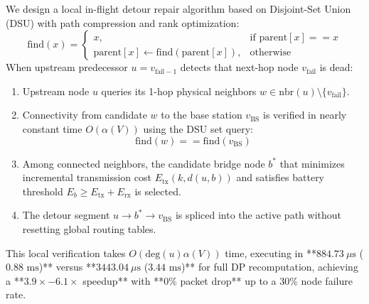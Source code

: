 \documentclass[journal]{IEEEtran}
\begin{document}
We design a local in-flight detour repair algorithm based on Disjoint-Set Union (DSU) with path compression and rank optimization:
\begin{equation}
\text{find}(x) = \begin{cases} x, & \text{if } \text{parent}[x] == x \\ \text{parent}[x] \leftarrow \text{find}(\text{parent}[x]), & \text{otherwise} \end{cases}
\end{equation}
When upstream predecessor $u = v_{\text{fail}-1}$ detects that next-hop node $v_{\text{fail}}$ is dead:
\begin{enumerate}
    \item Upstream node $u$ queries its 1-hop physical neighbors $w \in \text{nbr}(u) \setminus \{v_{\text{fail}}\}$.
    \item Connectivity from candidate $w$ to the base station $v_{\text{BS}}$ is verified in nearly constant time $O(\alpha(V))$ using the DSU set query:
    \begin{equation}
    \text{find}(w) == \text{find}(v_{\text{BS}})
    \end{equation}
    \item Among connected neighbors, the candidate bridge node $b^*$ that minimizes incremental transmission cost $E_{\text{tx}}(k, d(u, b))$ and satisfies battery threshold $E_{b} \ge E_{\text{tx}} + E_{\text{rx}}$ is selected.
    \item The detour segment $u \to b^* \to v_{\text{BS}}$ is spliced into the active path without resetting global routing tables.
\end{enumerate}
This local verification takes $O(\text{deg}(u)\alpha(V))$ time, executing in **$884.73\ \mu\text{s}$ ($0.88\text{ ms}$)** versus **$3443.04\ \mu\text{s}$ ($3.44\text{ ms}$)** for full DP recomputation, achieving a **$3.9\times - 6.1\times$ speedup** with **0\% packet drop** up to a 30\% node failure rate.
\end{document}

